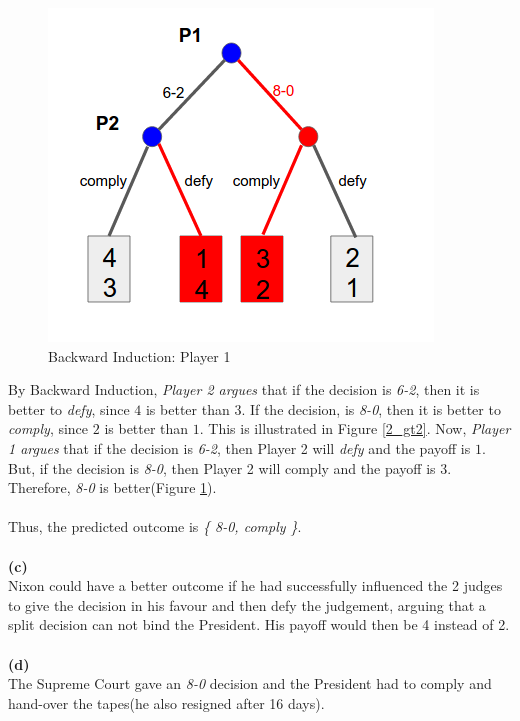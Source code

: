 \documentclass{article}
\begin{document}
\begin{figure}[h!]
\begin{multicols}{3}
\includegraphics[width=1\columnwidth]{2_gt3.png}
\caption{Backward Induction: Player 1}
\label{2_gt3}
\end{multicols}
\end{figure}

By Backward Induction, \emph{Player 2 argues} that if the decision is \emph{6-2}, then it is better to \emph{defy}, since $4$ is better than $3$. If the decision, is \emph{8-0}, then it is better to \emph{comply}, since $2$ is better than $1$. This is illustrated in Figure \ref{2_gt2}. Now, \emph{Player 1 argues} that if the decision is \emph{6-2}, then Player 2 will \emph{defy} and the payoff is $1$. But, if the decision is \emph{8-0}, then Player 2 will comply and the payoff is $3$. Therefore, \emph{8-0} is better(Figure \ref{2_gt3}). \\ \\
Thus, the predicted outcome is \emph{\{ 8-0, comply \}}. \\ \\
\textbf{(c)} \\
Nixon could have a better outcome if he had successfully influenced the 2 judges to give the decision in his favour and then defy the judgement, arguing that a split decision can not bind the President. His payoff would then be 4 instead of 2.\\ \\
\textbf{(d)} \\
The Supreme Court gave an \emph{8-0} decision and the President had to comply and hand-over the tapes(he also resigned after 16 days).
\end{document}
